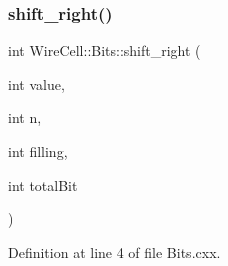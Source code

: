 \subsubsection{\texorpdfstring{shift\+\_\+right()}{shift\_right()}}
{\footnotesize\ttfamily int Wire\+Cell\+::\+Bits\+::shift\+\_\+right (\begin{DoxyParamCaption}\item[{int}]{value,  }\item[{int}]{n,  }\item[{int}]{filling,  }\item[{int}]{total\+Bit }\end{DoxyParamCaption})}



Definition at line 4 of file Bits.\+cxx.

